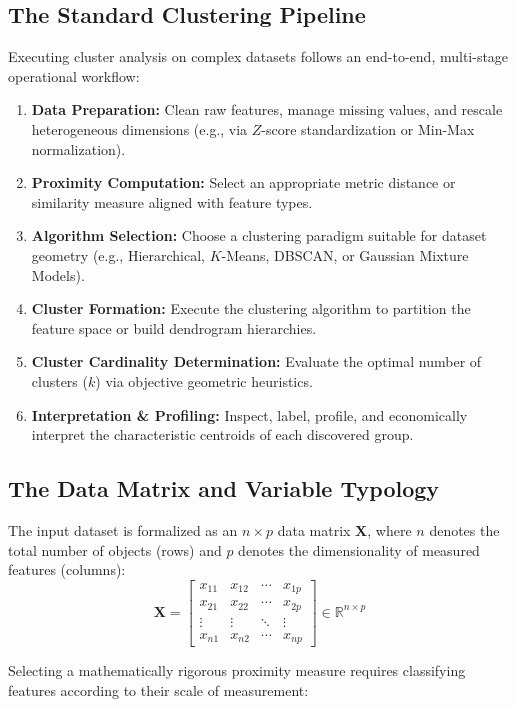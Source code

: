 \subsection{The Standard Clustering Pipeline}
Executing cluster analysis on complex datasets follows an end-to-end, multi-stage operational workflow:
\begin{enumerate}
    \item \textbf{Data Preparation:} Clean raw features, manage missing values, and rescale heterogeneous dimensions (e.g., via $Z$-score standardization or Min-Max normalization).
    \item \textbf{Proximity Computation:} Select an appropriate metric distance or similarity measure aligned with feature types.
    \item \textbf{Algorithm Selection:} Choose a clustering paradigm suitable for dataset geometry (e.g., Hierarchical, $K$-Means, DBSCAN, or Gaussian Mixture Models).
    \item \textbf{Cluster Formation:} Execute the clustering algorithm to partition the feature space or build dendrogram hierarchies.
    \item \textbf{Cluster Cardinality Determination:} Evaluate the optimal number of clusters ($k$) via objective geometric heuristics.
    \item \textbf{Interpretation \& Profiling:} Inspect, label, profile, and economically interpret the characteristic centroids of each discovered group.
\end{enumerate}

\subsection{The Data Matrix and Variable Typology}
The input dataset is formalized as an $n \times p$ data matrix $\mathbf{X}$, where $n$ denotes the total number of objects (rows) and $p$ denotes the dimensionality of measured features (columns):
\begin{equation}
\mathbf{X} = \begin{bmatrix}
x_{11} & x_{12} & \cdots & x_{1p} \\
x_{21} & x_{22} & \cdots & x_{2p} \\
\vdots & \vdots & \ddots & \vdots \\
x_{n1} & x_{n2} & \cdots & x_{np}
\end{bmatrix} \in \mathbb{R}^{n \times p}
\end{equation}

Selecting a mathematically rigorous proximity measure requires classifying features according to their scale of measurement:

